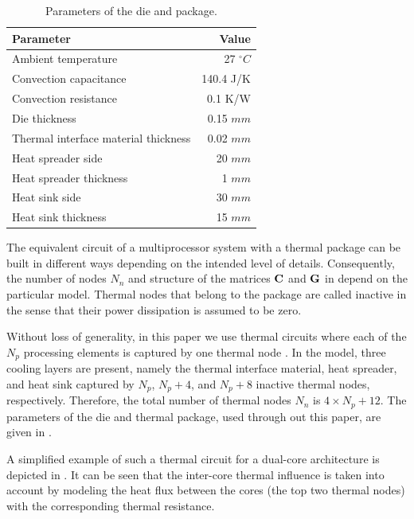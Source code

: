 \begin{table}
  \caption{Parameters of the die and package.}
  \label{tab:parameters}
  \centering
  \begin{tabular}{|l|r|}
    \hline
    Parameter & Value \\
    \hline
    \hline
    Ambient temperature                   &   27 ${}^\circ C$ \\
    Convection capacitance                & 140.4 J/K \\
    Convection resistance                 & 0.1 K/W \\
    Die thickness                         & 0.15 $mm$ \\
    Thermal interface material thickness  & 0.02 $mm$ \\
    Heat spreader side                    &   20 $mm$ \\
    Heat spreader thickness               &    1 $mm$ \\
    Heat sink side                        &   30 $mm$ \\
    Heat sink thickness                   &   15 $mm$ \\
    \hline
  \end{tabular}
  \vspace{15pt}
\end{table}
The equivalent circuit of a multiprocessor system with a thermal package can be built in different ways depending on the intended level of details. Consequently, the number of nodes $N_n$ and structure of the matrices $\mathbf{C}$ and $\mathbf{G}$ in  depend on the particular model. Thermal nodes that belong to the package are called inactive in the sense that their power dissipation is assumed to be zero.

Without loss of generality, in this paper we use thermal circuits where each of the $N_p$ processing elements is captured by one thermal node \cite{huang2003}. In the model, three cooling layers are present, namely the thermal interface material, heat spreader, and heat sink captured by $N_p$, $N_p + 4$, and $N_p + 8$ inactive thermal nodes, respectively. Therefore, the total number of thermal nodes $N_n$ is $4 \times N_p + 12$. The parameters of the die and thermal package, used through out this paper, are given in .

A simplified example of such a thermal circuit for a dual-core architecture is depicted in . It can be seen that the inter-core thermal influence is taken into account by modeling the heat flux between the cores (the top two thermal nodes) with the corresponding thermal resistance.

